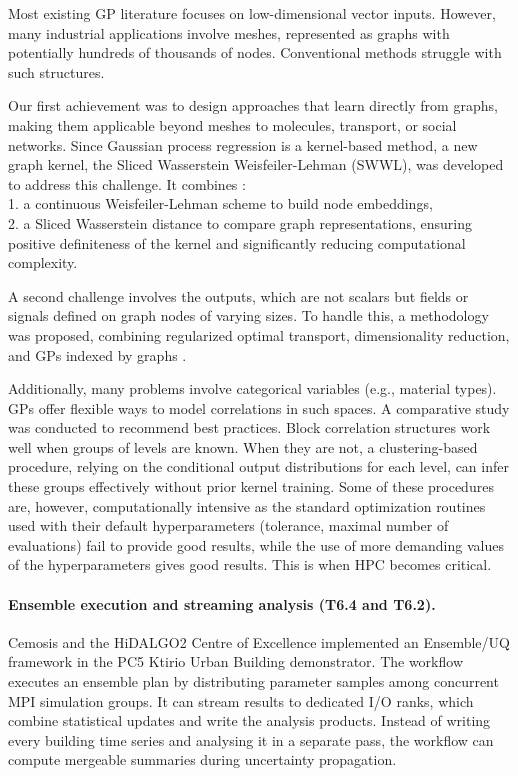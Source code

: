 Most existing GP literature focuses on low-dimensional vector inputs. However, many industrial applications involve meshes, represented as graphs with potentially hundreds of thousands of nodes. Conventional methods struggle with such structures.

Our first achievement was to design approaches that learn directly from graphs, making them applicable beyond meshes to molecules, transport, or social networks.
Since Gaussian process regression is a kernel-based method,
a new graph kernel, the Sliced Wasserstein Weisfeiler-Lehman (SWWL), was developed to address this challenge. It combines \cite{carpintero2024}:\\
	1.	a continuous Weisfeiler-Lehman scheme to build node embeddings,\\
	2.	a Sliced Wasserstein distance to compare graph representations, ensuring positive definiteness of the kernel and significantly reducing computational complexity.

A second challenge involves the outputs, which are not scalars but fields or signals defined on graph nodes of varying sizes. To handle this, a methodology was proposed, combining regularized optimal transport, dimensionality reduction, and GPs indexed by graphs \cite{carpintero2025}.

Additionally, many problems involve categorical variables (e.g., material types). GPs offer flexible ways to model correlations in such spaces. A comparative study was conducted to recommend best practices. Block correlation structures work well when groups of levels are known. When they are not, a clustering-based procedure, relying on the conditional output distributions for each level, can infer these groups effectively without prior kernel training.
Some of these procedures are, however, computationally intensive as the standard optimization routines used with their default hyperparameters (tolerance, maximal number of evaluations) fail to provide good results, while the use of more demanding values of the hyperparameters gives good results. This is when HPC becomes critical.


\paragraph{Ensemble execution and streaming analysis (T6.4 and T6.2).}
\label{sec:wp6:ensemble-streaming}
Cemosis and the HiDALGO2 Centre of Excellence implemented an Ensemble/UQ
framework in the PC5 Ktirio Urban Building demonstrator. The workflow
executes an ensemble plan by distributing parameter samples among
concurrent MPI simulation groups. It can stream results to dedicated I/O
ranks, which combine statistical updates and write the analysis products.
Instead of writing every building time series and analysing it in a
separate pass, the workflow can compute mergeable summaries during
uncertainty propagation.

